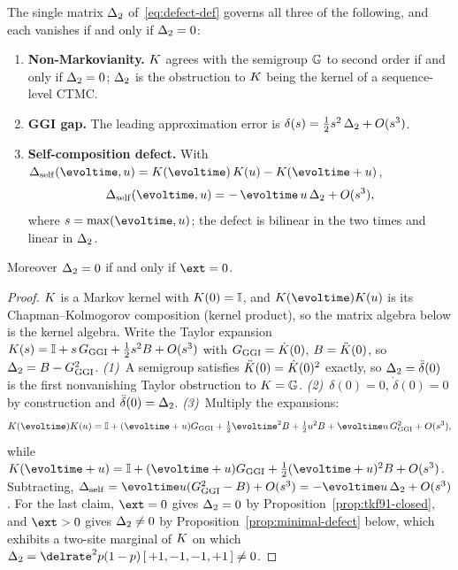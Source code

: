 \begin{theorem}
\label{thm:defect-unification}
The single matrix $\Delta_2$ of~\eqref{eq:defect-def} governs all three
of the following, and each vanishes if and only if $\Delta_2 = 0$:
\begin{enumerate}[nosep]
\item \textbf{Non-Markovianity.} $K$ agrees with the semigroup
  $\mathbb{G}$ to second order if and only if $\Delta_2=0$; $\Delta_2$
  is the obstruction to $K$ being the kernel of a sequence-level
  CTMC.
\item \textbf{GGI gap.} The leading approximation error is
  $\delta(s) = \tfrac12 s^2\,\Delta_2 + O(s^3)$.
\item \textbf{Self-composition defect.} With
  $\Delta_{\mathrm{self}}(\evoltime,\evolu) =
   \obskern(\evoltime)\,\obskern(\evolu) -
   \obskern(\evoltime+\evolu)$,
  \[
  \Delta_{\mathrm{self}}(\evoltime,\evolu)
  = -\,\evoltime\,\evolu\,\compdefect + O(s^3),
  \]
  where $s=\max(\evoltime,\evolu)$; the defect is bilinear in the two
  times and linear in $\Delta_2$.
\end{enumerate}
Moreover $\Delta_2 = 0$ if and only if $\ext = 0$.
\end{theorem}

\begin{proof}
$K$ is a Markov kernel with $K(0)=\mathbb{I}$, and
$\obskern(\evoltime)\obskern(\evolu)$ is its Chapman--Kolmogorov
composition (kernel product), so the matrix algebra below is the kernel
algebra.  Write the Taylor expansion
$K(s) = \mathbb{I} + s\,G_{\mathrm{GGI}} + \tfrac12 s^2 B + O(s^3)$ with
$G_{\mathrm{GGI}}=\dot{K}(0)$, $B=\ddot{K}(0)$, so
$\Delta_2 = B - G_{\mathrm{GGI}}^2$.
\emph{(1)}~A semigroup satisfies $\ddot{K}(0)=\dot{K}(0)^2$
exactly, so $\Delta_2=\ddot\delta(0)$ is the first nonvanishing Taylor
obstruction to $K=\mathbb{G}$.
\emph{(2)}~$\delta(0)=0$, $\dot\delta(0)=0$ by construction and
$\ddot\delta(0)=\Delta_2$.
\emph{(3)}~Multiply the expansions:
\[
\obskern(\evoltime)\obskern(\evolu)
= \mathbb{I} + (\evoltime+\evolu)\ggigen
+ \tfrac12\evoltime^2 B + \tfrac12\evolu^2 B + \evoltime\evolu\,\ggigen^2
+ O(s^3),
\]
while $\obskern(\evoltime+\evolu) = \mathbb{I} + (\evoltime+\evolu)\ggigen
+ \tfrac12(\evoltime+\evolu)^2 B + O(s^3)$.  Subtracting,
$\Delta_{\mathrm{self}} = \evoltime\evolu(\ggigen^2 - B) + O(s^3)
= -\evoltime\evolu\,\compdefect + O(s^3)$.
For the last claim, $\ext=0$ gives $\Delta_2=0$ by
Proposition~\ref{prop:tkf91-closed}, and $\ext>0$ gives
$\Delta_2\neq 0$ by Proposition~\ref{prop:minimal-defect} below, which
exhibits a two-site marginal of $K$ on which
$\compdefect = \delrate^2 p(1-p)\,[\,{+}1,{-}1,{-}1,{+}1\,]\neq 0$.
\end{proof}

